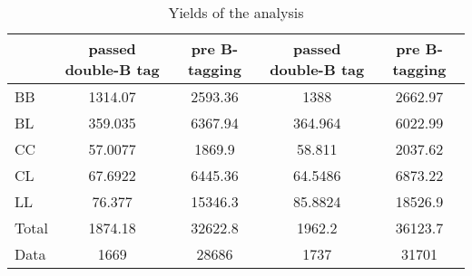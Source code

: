 \documentclass[10pt]{article}
\begin{document}
\begin{table}[htbp]
\begin{center}
\begin{tabular}{|l|S|S|S|S|}
\hline 
 & {passed double-B tag} & {pre B-tagging} & {passed double-B tag} & {pre B-tagging}\\
\hline 
  BB   & 1314.07  & 2593.36  & 1388  & 2662.97  \\ 
  BL   & 359.035  & 6367.94  & 364.964  & 6022.99  \\ 
  CC   & 57.0077  & 1869.9  & 58.811  & 2037.62  \\ 
  CL   & 67.6922  & 6445.36  & 64.5486  & 6873.22  \\ 
  LL   & 76.377  & 15346.3  & 85.8824  & 18526.9  \\ 
\hline 
  Total  & 1874.18  & 32622.8  & 1962.2  & 36123.7  \\ 
\hline 
  Data   & 1669 & 28686 & 1737 & 31701 \\ 
\hline 
\end{tabular} 
\caption{Yields of the analysis} 
\end{center} 
\end{table} 
\end{document}
